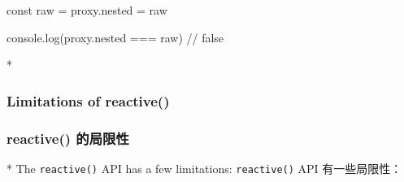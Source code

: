 \begin{paracol}{2}
\begin{codeJs}
const raw = {}
proxy.nested = raw

console.log(proxy.nested === raw) // false
\end{codeJs}

\switchcolumn[0]*%
\subsubsection{Limitations of reactive()}
\switchcolumn
\subsubsection{reactive() 的局限性}
\switchcolumn[0]*%
The \texttt{reactive()} API has a few limitations:
\switchcolumn
\texttt{reactive()} API 有一些局限性：
\end{paracol}

